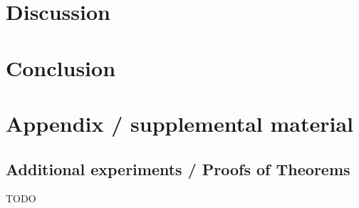 \documentclass{article}
\begin{document}
\section{Discussion}\label{sec:disc}


\section{Conclusion}\label{sec:concl}








\newpage
\appendix
\section{Appendix / supplemental material}\label{app}

\subsection{Additional experiments / Proofs of Theorems}\label{app:exp}

TODO
\end{document}
